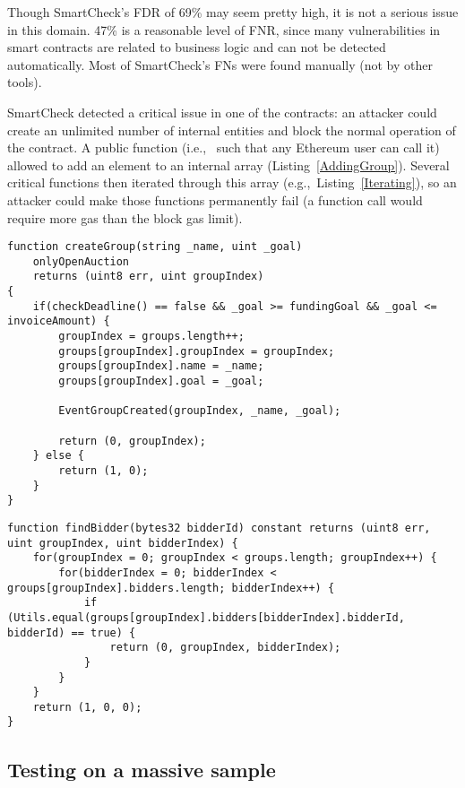Though SmartCheck's FDR of 69\% may seem pretty high, it is not a serious issue in this domain.
47\% is a reasonable level of FNR, since many vulnerabilities in smart contracts are related to business logic and can not be detected automatically.
Most of SmartCheck's FNs were found manually (not by other tools).

SmartCheck detected a critical issue in one of the contracts: an attacker could create an unlimited number of internal entities and block the normal operation of the contract.
A public function (i.e.,~ such that any Ethereum user can call it) allowed to add an element to an internal array (Listing~\ref{AddingGroup}).
Several critical functions then iterated through this array (e.g.,~Listing~\ref{Iterating}), so an attacker could make those functions permanently fail (a function call would require more gas than the block gas limit).

\begin{lstlisting}[caption={Adding an element to the internal array},label={AddingGroup},language=Solidity]
function createGroup(string _name, uint _goal)
    onlyOpenAuction
    returns (uint8 err, uint groupIndex)
{
	if(checkDeadline() == false && _goal >= fundingGoal && _goal <= invoiceAmount) {
		groupIndex = groups.length++;
		groups[groupIndex].groupIndex = groupIndex;
		groups[groupIndex].name = _name;
		groups[groupIndex].goal = _goal;

		EventGroupCreated(groupIndex, _name, _goal);

		return (0, groupIndex);
	} else {
		return (1, 0);
	}
}
\end{lstlisting}

\begin{lstlisting}[caption={Iterating through the internal array},label={Iterating},language=Solidity]
function findBidder(bytes32 bidderId) constant returns (uint8 err, uint groupIndex, uint bidderIndex) {
	for(groupIndex = 0; groupIndex < groups.length; groupIndex++) {
		for(bidderIndex = 0; bidderIndex < groups[groupIndex].bidders.length; bidderIndex++) {
			if (Utils.equal(groups[groupIndex].bidders[bidderIndex].bidderId, bidderId) == true) {
				return (0, groupIndex, bidderIndex);
			}
		}
	}
	return (1, 0, 0);
}
\end{lstlisting}

\subsection{Testing on a massive sample} \label{MassiveTesting}

